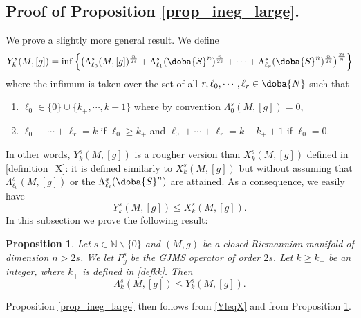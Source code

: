 \documentclass[10pt]{amsart}
\numberwithin{equation}{section}
\def\La{{\Lambda}}
\gdef\mN{\doba{N}}
\gdef\mS{\doba{S}}
\theoremstyle{plain}
\newtheorem{prop}[theo]{Proposition}%
\theoremstyle{remark}
\begin{document}
\subsection{Proof of Proposition \ref{prop_ineg_large}.}

We prove a slightly more general result. We define 
\begin{equation} \label{defYks}
Y_k^s(M,[g]) = \inf \left\{ \left( \La_{\ell_0}^s(M,[g])^{\frac{n}{2s}} + \La_{\ell_1}^s(\mS^n)^{\frac{n}{2s}} +  \cdots + \La_{\ell_r}^s(\mS^n)^{\frac{n}{2s}} \right)^{\frac{2s}{n}} \right\}
\end{equation}
where the infimum is taken over the set of  all $r,\ell_0,\cdots,\ell_r \in \mN$ such that 
\begin{enumerate}
\item  $\ell_0 \in \{ 0 \} \cup \{ k_+ ,\cdots, k - 1 \}$ where by convention $\Lambda_0^s(M,[g])= 0$,
 \item $\ell_0  + \cdots + \ell_r =k$ if $\ell_0 \geq k_+ $ and $\ell_0+ \cdots + \ell_r= k-k_+ +1$ if $\ell_0 =0$.
 \end{enumerate}
In other words, $Y_k^s(M,[g])$ is a rougher version than $X_k^s(M,[g])$ defined in  \eqref{definition_X}: it is defined similarly to $X_k^s(M,[g])$ but without assuming that $ \La_{\ell_0}^s(M,[g])$ or the $\La_{\ell_i}^s(\mS^n)$ are attained. As a consequence, we easily have
\begin{equation} \label{YleqX}
 Y_k^s(M,[g]) \leq X_k^s(M,[g]). 
\end{equation}
In this subsection we prove the following result:

\begin{prop} \label{prop_ineg_large2}
Let $s \in \mathbb{N} \backslash \{0\}$ and $(M,g)$ be a closed Riemannian manifold of dimension $n > 2s$. We let $P_g^s$ be the GJMS operator of order $2s$. Let $k \geq k_+$ be an integer, where $k_+$ is defined in \eqref{defkk}. Then 
 $$\La_k^s(M,[g]) \leq  Y_k^s(M,[g]).$$ 
\end{prop}
Proposition \ref{prop_ineg_large} then follows from \eqref{YleqX} and from Proposition \ref{prop_ineg_large2}. %
\end{document}

